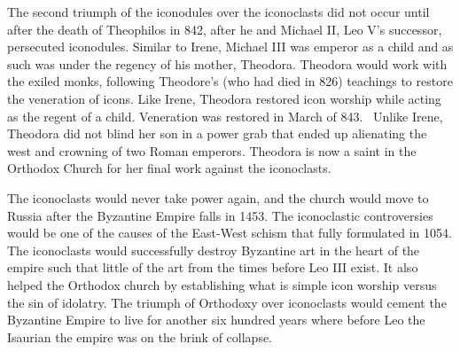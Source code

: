 \documentclass[12pt]{article}
\begin{document}
    The second triumph of the iconodules over the iconoclasts did not occur until after the death of Theophilos in 842, after he and Michael II, Leo V's successor, persecuted iconodules. Similar to Irene, Michael III was emperor as a child and as such was under the regency of his mother, Theodora. Theodora would work with the exiled monks, following Theodore's (who had died in 826) teachings to restore the veneration of icons. Like Irene, Theodora restored icon worship while acting as the regent of a child. Veneration was restored in March of 843.~\cite[p. 112]{Herrin} Unlike Irene, Theodora did not blind her son in a power grab that ended up alienating the west and crowning of two Roman emperors. Theodora is now a saint in the Orthodox Church for her final work against the iconoclasts. \

    The iconoclasts would never take power again, and the church would move to Russia after the Byzantine Empire falls in 1453. The iconoclastic controversies would be one of the causes of the East-West schism that fully formulated in 1054. The iconoclasts would successfully destroy Byzantine art in the heart of the empire such that little of the art from the times before Leo III exist. It also helped the Orthodox church by establishing what is simple icon worship versus the sin of idolatry. The triumph of Orthodoxy over iconoclasts would cement the Byzantine Empire to live for another six hundred years where before Leo the Isaurian the empire was on the brink of collapse.

    
    
\end{document}
